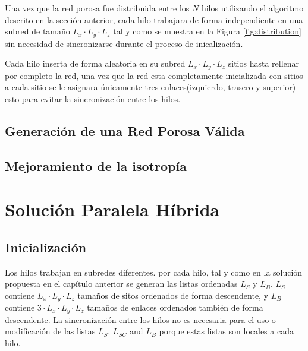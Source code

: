 

Una vez que la red porosa fue distribuida entre los $N$ hilos utilizando el algoritmo descrito en la sección anterior, cada hilo trabajara de forma independiente en una subred de tamaño $L_x \cdot L_y \cdot L_z$ tal y como se muestra en la Figura \ref{fig:distribution} sin necesidad de sincronizarse durante el proceso de inicalización.

Cada hilo inserta de forma aleatoria en su subred $L_x \cdot L_y \cdot L_z$ sitios hasta rellenar por completo la red, una vez que la red esta completamente inicializada con sitios a cada sitio se le asignara únicamente tres enlaces(izquierdo, trasero y superior) esto para evitar la sincronización entre los hilos.

\subsection{Generación de una Red Porosa Válida}
\label{subsec:pavalid}

\subsection{Mejoramiento de la isotropía}
\label{subsec:paisotropy}

\section{Solución Paralela Híbrida}
\subsection{Inicialización}
\label{subsec:pinit}
Los hilos trabajan en subredes diferentes. por cada hilo, tal y como en la solución propuesta en el capítulo anterior se generan las listas ordenadas $L_S$ y $L_B$. $L_S$ contiene $L_x \cdot L_y \cdot L_z$ tamaños de sitos ordenados de forma descendente, y $L_B$ contiene $3\cdot L_x \cdot L_y \cdot L_z$ tamaños de enlaces ordenados también de forma descendente. La sincronización entre los hilos no es necesaria para el uso o modificación de las listas $L_S$, $L_{SC}$ and $L_B$ porque estas listas son locales a cada hilo.


